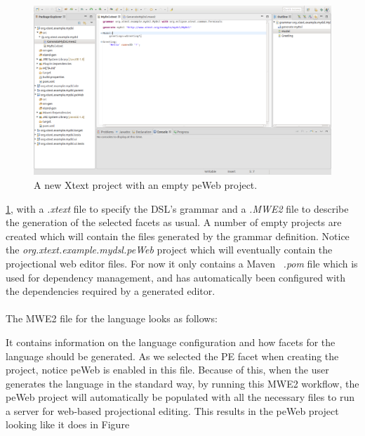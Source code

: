 \documentclass{article}
\begin{document}
\begin{figure}[h!]
  \includegraphics[width=\linewidth]{./Screenshots/newProjectScreen.png}
  \caption{A new Xtext project with an empty peWeb project.}
  \label{fig:newProjectScreen}
\end{figure} \ref{fig:newProjectScreen}, with a \emph{.xtext} file to specify the DSL's grammar and a \emph{.MWE2} file to describe the generation of the selected facets as usual. A number of empty projects are created which will contain the files generated by the grammar definition. Notice the \emph{org.xtext.example.mydsl.peWeb} project which will eventually contain the projectional web editor files. For now it only contains a Maven~\cite{maven} \emph{.pom} file which is used for dependency management, and has automatically been configured with the dependencies required by a generated editor. 
\\
\\
The MWE2 file for the language looks as follows:

It contains information on the language configuration and how facets for the language should be generated. As we selected the PE facet when creating the project, notice peWeb is enabled in this file. Because of this, when the user generates the language in the standard way, by running this MWE2 workflow, the peWeb project will automatically be populated with all the necessary files to run a server for web-based projectional editing. This results in the peWeb project looking like it does in Figure 
\end{document}
